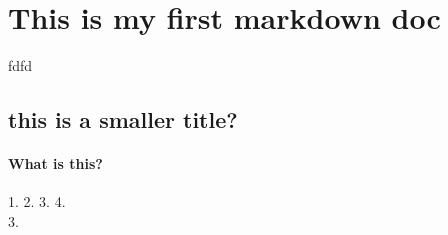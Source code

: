 \part{This is my first markdown doc}
\label{thisismyfirstmarkdowndoc}

fdfd 

\chapter{this is a smaller title?}
\label{thisisasmallertitle}

\subsection{What is this?}
\label{whatisthis}

1.
2.
3.
 4.\\
3. 
